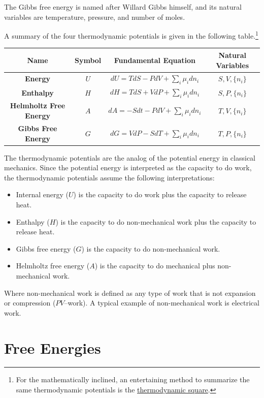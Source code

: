 \documentclass[
]{book}
\providecommand{\tightlist}{%
  \setlength{\itemsep}{0pt}\setlength{\parskip}{0pt}}
\theoremstyle{definition}
\theoremstyle{definition}
\theoremstyle{definition}
\theoremstyle{remark}
\begin{document}
The Gibbs free energy is named after Willard Gibbs himself, and its natural variables are temperature, pressure, and number of moles.

A summary of the four thermodynamic potentials is given in the following table.\footnote{For the mathematically inclined, an entertaining method to summarize the same thermodynamic potentials is the \href{https://en.wikipedia.org/wiki/Thermodynamic_square}{thermodynamic square}.}

\begin{longtable}[]{@{}cccc@{}}
\toprule
\textbf{Name} & \textbf{Symbol} & \textbf{Fundamental Equation} & \textbf{Natural Variables}\tabularnewline
\midrule
\endhead
\textbf{Energy} & \(U\) & \(dU=TdS-PdV+\sum_i\mu_i dn_i\) & \(S,V,\{n_i\}\)\tabularnewline
\textbf{Enthalpy} & \(H\) & \(dH=TdS+VdP+\sum_i\mu_i dn_i\) & \(S,P,\{n_i\}\)\tabularnewline
\textbf{Helmholtz Free Energy} & \(A\) & \(dA=-Sdt-PdV+\sum_i\mu_i dn_i\) & \(T,V,\{n_i\}\)\tabularnewline
\textbf{Gibbs Free Energy} & \(G\) & \(dG=VdP-SdT+\sum_i\mu_i dn_i\) & \(T,P,\{n_i\}\)\tabularnewline
\bottomrule
\end{longtable}

The thermodynamic potentials are the analog of the potential energy in classical mechanics. Since the potential energy is interpreted as the capacity to do work, the thermodynamic potentials assume the following interpretations:

\begin{itemize}
\tightlist
\item
  Internal energy (\(U\)) is the capacity to do work plus the capacity to release heat.
\item
  Enthalpy (\(H\)) is the capacity to do non-mechanical work plus the capacity to release heat.
\item
  Gibbs free energy (\(G\)) is the capacity to do non-mechanical work.
\item
  Helmholtz free energy (\(A\)) is the capacity to do mechanical plus non-mechanical work.
\end{itemize}

Where non-mechanical work is defined as any type of work that is not expansion or compression (\(PV\)--work). A typical example of non-mechanical work is electrical work.

\hypertarget{freeenergies}{%
\section{Free Energies}\label{freeenergies}}
\end{document}
